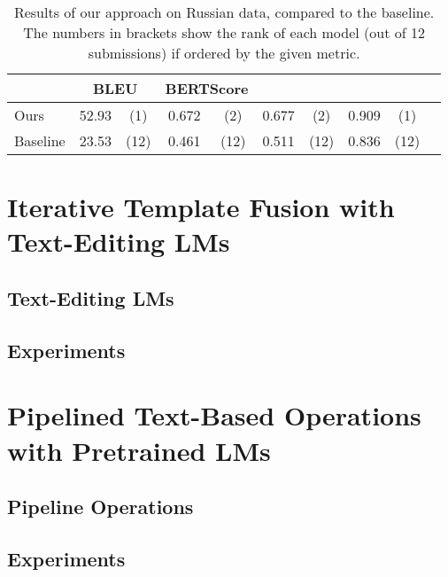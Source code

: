 \begin{table*}[t]
    \small\centering
    \begin{tabular}{llcccccccc}\toprule
                 & \multicolumn{2}{c}{\bf BLEU} & \multicolumn{2}{c}{\bf BERTScore}                                              \\\midrule
        Ours     & 52.93                        & (1)                               & 0.672 & (2)  & 0.677 & (2)  & 0.909 & (1)  \\
        Baseline & 23.53                        & (12)                              & 0.461 & (12) & 0.511 & (12) & 0.836 & (12) \\\bottomrule
    \end{tabular}
    \caption{Results of our approach on Russian data, compared to the baseline. The numbers in brackets show the rank of each model (out of 12 submissions) if ordered by the given metric.}
    \label{tab:mbart:results-ru}
\end{table*}





\section{Iterative Template Fusion with Text-Editing LMs}
\label{sec:iterative}
\subsection{Text-Editing LMs}
\label{sec:text-editing}
\subsection{Experiments}
\label{sec:text-editing-exp}
\section{Pipelined Text-Based Operations with Pretrained LMs}
\label{sec:pipeline}
\subsection{Pipeline Operations}
\label{sec:pipeline-ops}
\subsection{Experiments}
\label{sec:pipeline-exp}
